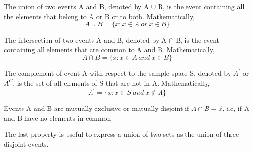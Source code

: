 \begin{definition}[Union]
The union of two events A and B, denoted by A $\cup$ B, is the event containing all the elements that belong to A or B or to both. Mathematically, $$A \cup B = \{x: x \in A \ or \  x \in B \}$$
\end{definition}

\begin{definition}[Intersection]
The intersection of two events A and B, denoted by A $\cap$ B, is the event containing all elements that are common to A and B. Mathematically, $$A \cap B = \{x: x \in A \ and \ x \in B \} $$
\end{definition}

\begin{definition}[Complement]
The complement of event A with respect to the sample space S, denoted by $A^{'}$ or $A^{C}$, is the set of all elements of S that are not in A. Mathematically, 
$$
A^{'} = \{x : x \in S \ and \ x \notin A \}
$$
\end{definition}

\begin{definition}
Events A and B are mutually exclusive or mutually disjoint if $A \cap B = \phi$, i.e, if A and B have no elements in common
\end{definition}

The last property is useful to express a union of two sets as the union of three disjoint events.

